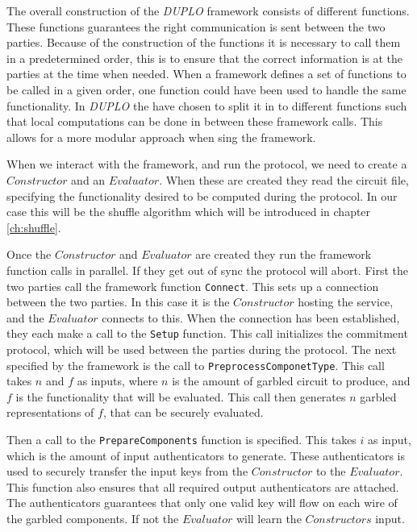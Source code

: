 \documentclass[twoside,11pt,openright]{report}
\newcommand{\DUPLO}{\textit{DUPLO} }
\begin{document}
The overall construction of the \DUPLO framework consists of different functions. These functions guarantees the right communication is sent between the two parties. Because of the construction of the functions it is necessary to call them in a predetermined order, this is to ensure that the correct information is at the parties at the time when needed. When a framework defines a set of functions to be called in a given order, one function could have been used to handle the same functionality. In \DUPLO the have chosen to split it in to different functions such that local computations can be done in between these framework calls. This allows for a more modular approach when sing the framework.

\bigskip

When we interact with the framework, and run the protocol, we need to create a $Constructor$ and an $Evaluator$. When these are created they read the circuit file, specifying the functionality desired to be computed during the protocol. In our case this will be the shuffle algorithm which will be introduced in chapter \ref{ch:shuffle}.

Once the $Constructor$ and $Evaluator$ are created they run the framework function calls in parallel. If they get out of sync the protocol will abort. First the two parties call the framework function \verb|Connect|. This sets up a connection between the two parties. In this case it is the $Constructor$ hosting the service, and the $Evaluator$ connects to this. When the connection has been established, they each make a call to the \verb|Setup| function. This call initializes the commitment protocol, which will be used between the parties during the protocol. The next specified by the framework is the call to \verb|PreprocessComponetType|. This call takes $n$ and $f$ as inputs, where $n$ is the amount of garbled circuit to produce, and $f$ is the functionality that will be evaluated. This call then generates $n$ garbled representations of $f$, that can be securely evaluated.

Then a call to the \verb|PrepareComponents| function is specified. This takes $i$ as input, which is the amount of input authenticators to generate. These authenticators is used to securely transfer the input keys from the $Constructor$ to the $Evaluator$. This function also ensures that all required output authenticators are attached. The authenticators guarantees that only one valid key will flow on each wire of the garbled components. If not the $Evaluator$ will learn the $Constructors$ input.
\end{document}
